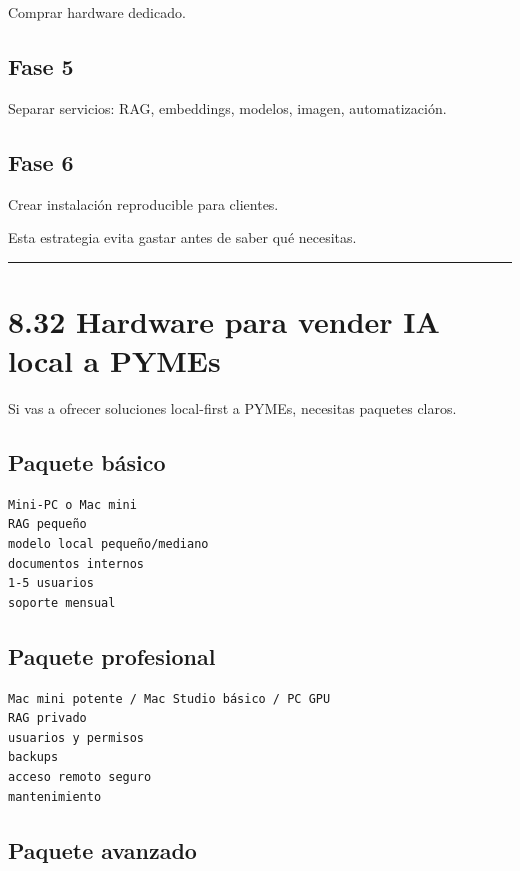 Comprar hardware dedicado.

\subsection{Fase 5}\label{fase-5}

Separar servicios: RAG, embeddings, modelos, imagen, automatización.

\subsection{Fase 6}\label{fase-6}

Crear instalación reproducible para clientes.

Esta estrategia evita gastar antes de saber qué necesitas.

\begin{center}\rule{0.5\linewidth}{0.5pt}\end{center}

\section{8.32 Hardware para vender IA local a
PYMEs}\label{hardware-para-vender-ia-local-a-pymes}

Si vas a ofrecer soluciones local-first a PYMEs, necesitas paquetes
claros.

\subsection{Paquete básico}\label{paquete-buxe1sico}

\begin{lstlisting}
Mini-PC o Mac mini
RAG pequeño
modelo local pequeño/mediano
documentos internos
1-5 usuarios
soporte mensual
\end{lstlisting}

\subsection{Paquete profesional}\label{paquete-profesional}

\begin{lstlisting}
Mac mini potente / Mac Studio básico / PC GPU
RAG privado
usuarios y permisos
backups
acceso remoto seguro
mantenimiento
\end{lstlisting}

\subsection{Paquete avanzado}\label{paquete-avanzado}

